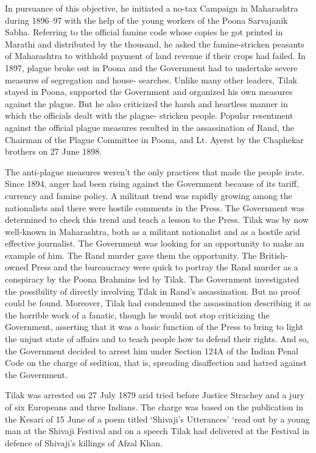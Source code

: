 In pursuance of this objective, he initiated a no-tax Campaign in Maharashtra during 1896--97 with the help of the young workers of the Poona Sarvajanik Sabha. Referring to the official famine code whose copies he got printed in Marathi and distributed by the thousand, he asked the famine-stricken peasants of Maharashtra to withhold payment of land revenue if their crops had failed. In 1897, plague broke out in Poona and the Government had to undertake severe measures of segregation and house- searches. Unlike many other leaders, Tilak stayed in Poona, supported the Government and organized his own measures against the plague. But he also criticized the harsh and heartless manner in which the officials dealt with the plague- stricken people. Popular resentment against the official plague measures resulted in the assassination of Rand, the Chairman of the Plague Committee in Poona, and Lt. Ayerst by the Chaphekar brothers on 27 June 1898.

The anti-plague measures weren't the only practices that made the people irate. Since 1894, anger had been rising against the Government because of its tariff, currency and famine policy. A militant trend was rapidly growing among the nationalists and there were hostile comments in the Press. The Government was determined to check this trend and teach a lesson to the Press. Tilak was by now well-known in Maharashtra, both as a militant nationalist and as a hostile arid effective journalist. The Government was looking for an opportunity to make an example of him. The Rand murder gave them the opportunity. The British- owned Press and the bureaucracy were quick to portray the Rand murder as a conspiracy by the Poona Brahmins led by Tilak. The Government investigated the possibility of directly involving Tilak in Rand's assassination. But no proof could be found. Moreover, Tilak had condemned the assassination describing it as the horrible work of a fanatic, though he would not stop criticizing the Government, asserting that it was a basic function of the Press to bring to light the unjust state of affairs and to teach people how to defend their rights. And so, the Government decided to arrest him under Section 124A of the Indian Penal Code on the charge of sedition, that is, spreading disaffection and hatred against the Government.

Tilak was arrested on 27 July 1879 arid tried before Justice Strachey and a jury of six Europeans and three Indians. The charge was based on the publication in the Kesari of 15 June of a poem titled `Shivaji's Utterances' `read out by a young man at the Shivaji Festival and on a speech Tilak had delivered at the Festival in defence of Shivaji's killings of Afzal Khan.

